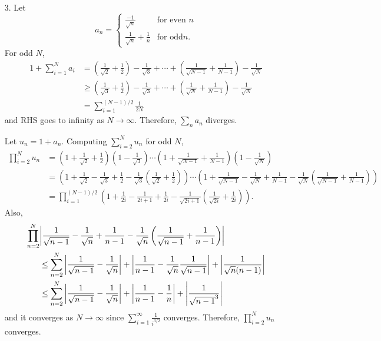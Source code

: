 \documentclass{article}
\begin{document}
\begin{enumerate}
\item[3.] Let
\begin{equation*}
a_n=\begin{cases}
\frac{-1}{\sqrt{n}} & \text{for even }n \\
\frac{1}{\sqrt{n}}+\frac{1}{n} & \text{for odd}n.
\end{cases}
\end{equation*}
For odd $N$, 
\begin{equation*}
\begin{split}
1+\sum\limits_{i=1}^N a_i&=\left(\frac{1}{\sqrt{2}}+\frac{1}{2}\right)-\frac{1}{\sqrt{3}}+\cdots +\left(\frac{1}{\sqrt{N-1}}+\frac{1}{N-1}\right)-\frac{1}{\sqrt{N}} \\
&\geq \left(\frac{1}{\sqrt{3}}+\frac{1}{2}\right)-\frac{1}{\sqrt{3}}+\cdots +\left(\frac{1}{\sqrt{N}}+\frac{1}{N-1}\right)-\frac{1}{\sqrt{N}} \\
&=\sum\limits_{i=1}^{(N-1)/2} \frac{1}{2N}
\end{split}
\end{equation*}
and RHS goes to infinity as $N\rightarrow \infty$. Therefore, $\sum\limits_n a_n$ diverges.

Let $u_n=1+a_n$. Computing $\sum\limits_{i=2}^N u_n$ for odd $N$,
\begin{equation*}
\begin{split}
\prod\limits_{i=2}^N u_n&=\left(1+\frac{1}{\sqrt{2}}+\frac{1}{2}\right)\left(1-\frac{1}{\sqrt{3}}\right)\cdots\left(1+\frac{1}{\sqrt{N-1}}+\frac{1}{N-1}\right)\left(1-\frac{1}{\sqrt{N}}\right) \\
&=\left(1+\frac{1}{\sqrt{2}}-\frac{1}{\sqrt{3}}+\frac{1}{2}-\frac{1}{\sqrt{3}}\left(\frac{1}{\sqrt{2}}+\frac{1}{2}\right)\right)\cdots \left(1+\frac{1}{\sqrt{N-1}}-\frac{1}{\sqrt{N}}+\frac{1}{N-1}-\frac{1}{\sqrt{N}}\left(\frac{1}{\sqrt{N-1}}+\frac{1}{N-1}\right)\right)\\
&=\prod_{i=1}^{(N-1)/2}\left(1+\frac{1}{2i}-\frac{1}{2i+1}+\frac{1}{2i}-\frac{1}{\sqrt{2i+1}}\left(\frac{1}{\sqrt{2i}}+\frac{1}{2i}\right)\right)
.
\end{split}
\end{equation*}
Also,
\begin{equation*}
\begin{split}
\prod\limits_{n=2}^N &\abs{\frac{1}{\sqrt{n-1}}-\frac{1}{\sqrt{n}}+\frac{1}{n-1}-\frac{1}{\sqrt{n}}\left(\frac{1}{\sqrt{n-1}}+\frac{1}{n-1}\right)} \\
&\leq \sum\limits_{n=2}^N \abs{\frac{1}{\sqrt{n-1}}-\frac{1}{\sqrt{n}}}+\abs{\frac{1}{n-1}-\frac{1}{\sqrt{n}}\frac{1}{\sqrt{n-1}}}+\abs{\frac{1}{\sqrt{n}(n-1)}} \\
&\leq \sum\limits_{n=2}^N \abs{\frac{1}{\sqrt{n-1}}-\frac{1}{\sqrt{n}}}+\abs{\frac{1}{n-1}-\frac{1}{n}}+\abs{\frac{1}{\sqrt{n-1}^3}}
\end{split}
\end{equation*}
and it converges as $N\rightarrow \infty$ since $\sum\limits_{i=1}^\infty \frac{1}{i^{3/2}}$ converges. Therefore, $\prod\limits_{i=2}^N u_n$ converges.


\end{enumerate}
\end{document}
